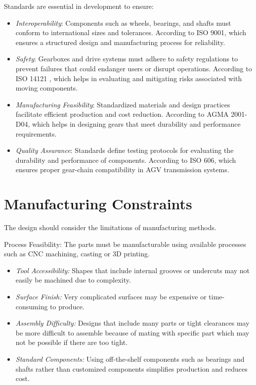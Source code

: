 \documentclass[../../main]{subfiles}
\begin{document}
Standards are essential in development to ensure:
\begin{itemize}
    \item \textit{Interoperability}: Components such as wheels, bearings, and shafts must conform to international sizes and tolerances. According to ISO 9001, which ensures a structured design and manufacturing process for reliability. 
    \item \textit{Safety}: Gearboxes and drive systems must adhere to safety regulations to prevent failures that could endanger users or disrupt operations. According to ISO 14121 ,  which helps in evaluating and mitigating risks associated with moving components.
    \item \textit{Manufacturing Feasibility}: Standardized materials and design practices facilitate efficient production and cost reduction. According to AGMA 2001-D04, which helps in designing gears that meet durability and performance requirements.
    \item \textit{Quality Assurance}: Standards define testing protocols for evaluating the durability and performance of components. According to ISO 606, which ensures proper gear-chain compatibility in AGV transmission systems.
\end{itemize}
\newpage
\section{Manufacturing Constraints}

The design should consider the limitations of manufacturing methods.

Process Feasibility: The parts must be manufacturable using available
processes such as CNC machining, casting or 3D printing.
\begin{itemize}
  \item 
  \textit{Tool Accessibility:} Shapes that include internal grooves or
  undercuts may not easily be machined due to complexity.
  \item 

  \textit{Surface Finish:} Very complicated surfaces may be expensive or
  time-consuming to produce.
  \item 

  \textit{Assembly Difficulty:} Designs that include many parts or tight
  clearances may be more difficult to assemble because of mating with
  specific part which may not be possible if there are too tight.
  \item 

  \textit{Standard Components:} Using off-the-shelf components such as
  bearings and shafts rather than customized components simplifies
  production and reduces cost.
\end{itemize}
\end{document}
